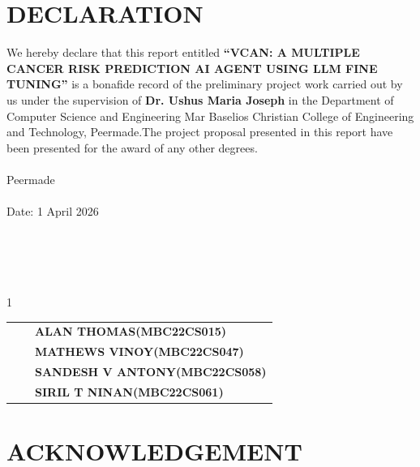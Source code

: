 \documentclass[a4paper,12pt]{report}
\begin{document}



\vspace{2cm}

\chapter*{DECLARATION}

\vspace{1cm}

\fontsize{12pt}{18pt}\selectfont
We hereby declare that this report entitled \textbf{\enquote {VCAN: A MULTIPLE CANCER RISK PREDICTION AI
AGENT USING LLM FINE TUNING}} is a bonafide record of the preliminary project work carried out by us under the supervision 
of \textbf{Dr. Ushus Maria Joseph} in the Department of Computer Science and Engineering Mar Baselios Christian College of Engineering and Technology, Peermade.The project proposal presented in this report have been presented for the award of any other degrees.\\
\\
Peermade \\
\\
Date: 1 April 2026 \\
\\
\\
\\
\\
\begin{spacing}{1}
	
	\begin{table}[h!]
		\centering
		\begin{tabular}{p{0.5cm} p{6cm} p{10cm}}
             \textbf{} &&\textbf {ALAN THOMAS(MBC22CS015)} \\[0.2cm]
            \textbf{} &&\textbf {MATHEWS VINOY(MBC22CS047)} \\[0.2cm]
            \textbf{} &&\textbf {SANDESH V ANTONY(MBC22CS058)} \\[0.2cm]
            \textbf{} && \textbf{SIRIL T NINAN(MBC22CS061)} \\[0.2cm]
            
			
		\end{tabular}
	\end{table}
\end{spacing}
\newpage

\chapter*{ACKNOWLEDGEMENT}
\vspace{1cm}
\end{document}
